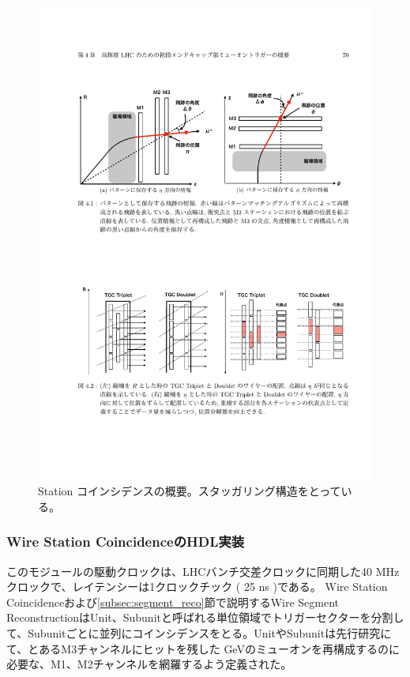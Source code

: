 \begin{figure} 
\centering
\includegraphics[width=16cm]{fig/SL/Concept_station.pdf}
\caption[Station コインシデンスの概要]{Station コインシデンスの概要\cite{mt_mino}。スタッガリング構造をとっている。}
\label{Concept_station}
\end{figure}

\subsubsection*{Wire Station CoincidenceのHDL実装}
このモジュールの駆動クロックは、LHCバンチ交差クロックに同期した40 MHzクロックで、レイテンシーは1クロックチック ( 25 ns )である。
Wire Station Coincidenceおよび\ref{subsec:segment_reco}節で説明するWire Segment ReconstructionはUnit、Subunitと呼ばれる単位領域でトリガーセクターを分割して、Subunitごとに並列にコインシデンスをとる。UnitやSubunitは先行研究にて、とあるM3チャンネルにヒットを残した  GeVのミューオンを再構成するのに必要な、M1、M2チャンネルを網羅するよう定義された。

